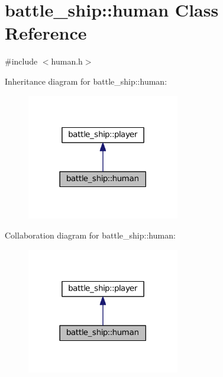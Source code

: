 \hypertarget{classbattle__ship_1_1human}{}\section{battle\+\_\+ship\+:\+:human Class Reference}
\label{classbattle__ship_1_1human}


{\ttfamily \#include $<$human.\+h$>$}



Inheritance diagram for battle\+\_\+ship\+:\+:human\+:
\nopagebreak
\begin{figure}[H]
\begin{center}
\leavevmode
\includegraphics[width=189pt]{classbattle__ship_1_1human__inherit__graph}
\end{center}
\end{figure}


Collaboration diagram for battle\+\_\+ship\+:\+:human\+:
\nopagebreak
\begin{figure}[H]
\begin{center}
\leavevmode
\includegraphics[width=189pt]{classbattle__ship_1_1human__coll__graph}
\end{center}
\end{figure}

